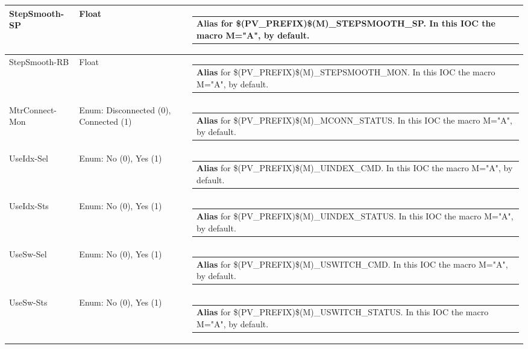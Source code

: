 \documentclass[openany]{article}
\begin{document}
\begin{longtable}{| m{4.5cm} m{2.5cm}  m{8.5cm} |}
        StepSmooth-SP & Float & \begin{tabular}{@{}m{6cm}@{}}
                \textbf{\color{blue} Alias} for \$(PV\_PREFIX)\$(M)\_STEPSMOOTH\_SP. In this IOC the macro M="A", by default.
            \end{tabular} \hypertarget{}{}\\ \hline
        StepSmooth-RB & Float & \begin{tabular}{@{}m{6cm}@{}}
                \textbf{\color{blue} Alias} for \$(PV\_PREFIX)\$(M)\_STEPSMOOTH\_MON. In this IOC the macro M="A", by default.
            \end{tabular} \hypertarget{pv:mtr-connect-mon}{}\\ \hline
        MtrConnect-Mon & Enum: Disconnected (0), Connected (1) & \begin{tabular}{@{}m{6cm}@{}}
                \textbf{\color{blue} Alias} for \$(PV\_PREFIX)\$(M)\_MCONN\_STATUS. In this IOC the macro M="A", by default.
            \end{tabular} \hypertarget{pv:use-idx}{}\\ \hline
        UseIdx-Sel & Enum: No (0), Yes (1) & \begin{tabular}{@{}m{6cm}@{}}
                \textbf{\color{blue} Alias} for \$(PV\_PREFIX)\$(M)\_UINDEX\_CMD. In this IOC the macro M="A", by default.
            \end{tabular} \hypertarget{}{}\\ \hline
        UseIdx-Sts & Enum: No (0), Yes (1) & \begin{tabular}{@{}m{6cm}@{}}
                \textbf{\color{blue} Alias} for \$(PV\_PREFIX)\$(M)\_UINDEX\_STATUS. In this IOC the macro M="A", by default.
            \end{tabular} \hypertarget{pv:use-sw}{}\\ \hline
        UseSw-Sel & Enum: No (0), Yes (1) & \begin{tabular}{@{}m{6cm}@{}}
                \textbf{\color{blue} Alias} for \$(PV\_PREFIX)\$(M)\_USWITCH\_CMD. In this IOC the macro M="A", by default.
            \end{tabular} \hypertarget{}{}\\ \hline
        UseSw-Sts & Enum: No (0), Yes (1) & \begin{tabular}{@{}m{6cm}@{}}
                \textbf{\color{blue} Alias} for \$(PV\_PREFIX)\$(M)\_USWITCH\_STATUS. In this IOC the macro M="A", by default.

\end{tabular}
\end{longtable}
\end{document}
